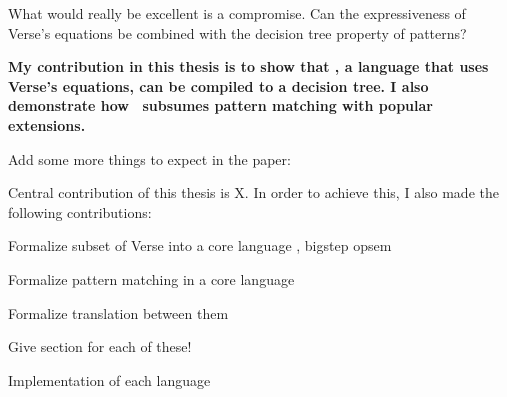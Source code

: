 \documentclass[manuscript,screen,review, 12pt, nonacm]{acmart}
\begin{document}
\begin{outline}[enumerate]
What would really be excellent is a compromise.
Can the expressiveness of Verse's equations be combined with the decision tree
property of patterns? 


\bf{My contribution in this thesis} is to show that \VMinus, a language that
uses Verse's equations, can be compiled to a decision tree. I also demonstrate
how \VMinus\ subsumes pattern matching with popular extensions. 

Add some more things to expect in the paper: 

Central contribution of this thesis is X. In order to achieve this, 
I also made the following contributions: 

Formalize subset of Verse into a core language \VMinus, bigstep opsem 

Formalize pattern matching in a core language \PPlus 

Formalize translation between them 

Give section for each of these! 

Implementation of each language 








\end{outline}
\end{document}
